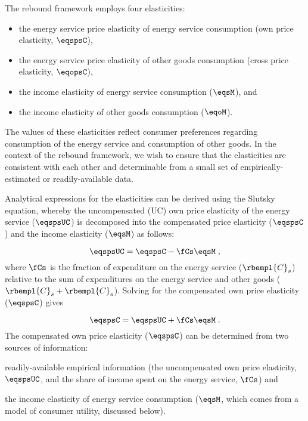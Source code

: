 

The rebound framework employs four elasticities:
%
\begin{itemize}

  \item the energy service price elasticity of energy service consumption (own price elasticity, $\eqspsC$),

  \item the energy service price elasticity of other goods consumption (cross price elasticity, $\eqopsC$), 
  
  \item the income elasticity of energy service consumption ($\eqsM$), and 
  
  \item the income elasticity of other goods consumption ($\eqoM$).

\end{itemize}
%
The values of these elasticities reflect consumer preferences regarding 
consumption of the energy service and consumption of other goods.
In the context of the rebound framework, 
we wish to ensure that the elasticities are consistent with each other
and determinable from a small set 
of empirically-estimated or readily-available data. 

Analytical expressions for the elasticities can be derived using the Slutsky equation, 
whereby the uncompensated (UC) own price elasticity 
of the energy service ($\eqspsUC$) 
is decomposed into the compensated price elasticity ($\eqspsC$) and
the income elasticity ($\eqsM$) as follows:

\begin{equation} \label{eq:slutsky}
  \eqspsUC = \eqspsC - \fCs \eqsM \; ,
\end{equation}
%
where $\fCs$ is the fraction of expenditure
on the energy service ($\rbempl{C}_s$)
relative to the sum of expenditures on the energy service and other goods
($\rbempl{C}_s + \rbempl{C}_o$). 
Solving for the compensated own price elasticity ($\eqspsC$) gives

\begin{equation} \label{eq:eqsps}
  \eqspsC = \eqspsUC + \fCs \eqsM \; .
\end{equation}
%
The compensated own price elasticity ($\eqspsC$)
can be determined from two sources of information:
%
\begin{enumerate*}[label={(\alph*)}]
	
  \item readily-available empirical information
        (the uncompensated own price elasticity, $\eqspsUC$, and 
        the share of income spent on the energy service, $\fCs$)
        and 
  
  \item the income elasticity of energy service consumption 
        ($\eqsM$, which comes from a model of consumer utility, discussed below).
    
\end{enumerate*}


